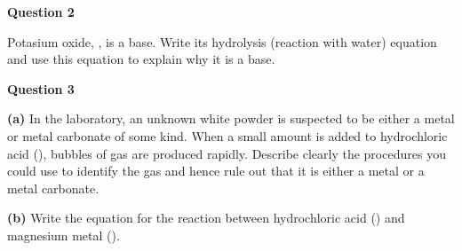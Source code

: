 \documentclass{article}
\begin{document}
{\begin{center}
\vspace{0.2cm}
\hspace{1cm}
\textbf{Question 2} 
\vspace{0.2cm}

Potasium oxide, , is a base. Write its hydrolysis (reaction with water) equation and use this equation to explain why it is a base.
\vspace{0.2cm}

\vspace{0.8cm}
\begin{center}
\end{center}
\vspace{0.2cm}

\pagebreak
\vspace{0.2cm}
\hspace{1cm}
\textbf{Question 3} 
\vspace{0.2cm}

\textbf{(a)} In the laboratory, an unknown white powder is suspected to be either a metal or metal carbonate of some kind. When a small amount is added to hydrochloric acid (), bubbles of gas are produced rapidly. Describe clearly the procedures you could use to identify the gas and hence rule out that it is either a metal or a metal carbonate.

\vspace{0.9cm}
\begin{center}
\end{center}
\vspace{0.2cm}

\textbf{(b)} Write the equation for the reaction between hydrochloric acid () and magnesium metal ().

\vspace{0.8cm}
\begin{center}
\end{center}
\vspace{0.2cm}


\end{center}}
\end{document}
